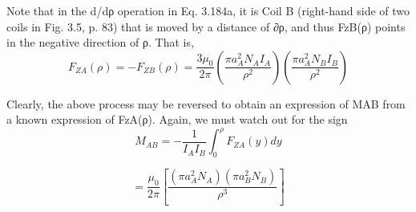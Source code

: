 Note that in the d/dρ operation in Eq. 3.184a, it is Coil B (right-hand side of two
coils in Fig. 3.5, p. 83) that is moved by a distance of ∂ρ, and thus FzB(ρ) points
in the negative direction of ρ. That is,
\begin{equation}%
F_{ZA}(\rho)=-F_{ZB}(\rho)
=\frac{3\mu_0}{2\pi}(\frac{\pi a_{A}^{2}N_A I_A}{\rho^2})(\frac{\pi a_{A}^{2}N_B I_B}{\rho^2})
\end{equation}

Clearly, the above process may be reversed to obtain an expression of MAB from a
known expression of FzA(ρ). Again, we must watch out for the sign
 \begin{equation}%
M_{AB}=-\frac{1}{I_AI_B}\int_{0}^{\rho}F_{ZA}(y)dy
\end{equation}

\begin{equation}%
=\frac{\mu_0}{2\pi}[\frac{(\pi a_{A}^{2}N_A)(\pi a_{B}^{2}N_B)}{\rho^3}]
\end{equation}

